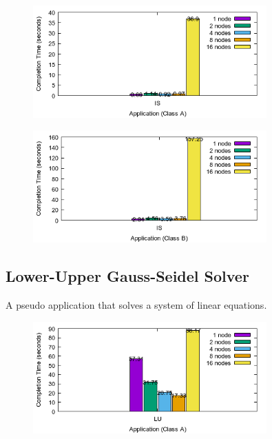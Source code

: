 \documentclass[a4paper]{article}
\begin{document}
\begin{figure}[H]
\centering
\includegraphics[width=0.8\textwidth]{figures/ISvA.png}
\caption{\label{fig:ISvA}}
\end{figure}

\begin{figure}[H]
\centering
\includegraphics[width=0.8\textwidth]{figures/ISvB.png}
\caption{\label{fig:ISvB}}
\end{figure}

\subsection{Lower-Upper Gauss-Seidel Solver}

A pseudo application that solves a system of linear equations.

\begin{figure}[H]
\centering
\includegraphics[width=0.8\textwidth]{figures/LUvA.png}
\caption{\label{fig:LUvA}}
\end{figure}
\end{document}
